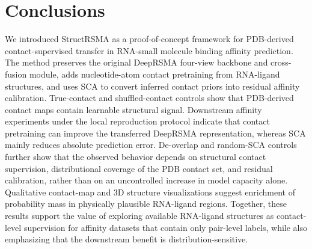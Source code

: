 ﻿\documentclass[journal=jcisd8,manuscript=article]{achemso}
\begin{document}
\section{Conclusions}

We introduced StructRSMA as a proof-of-concept framework for PDB-derived contact-supervised transfer in RNA-small molecule binding affinity prediction. The method preserves the original DeepRSMA four-view backbone and cross-fusion module, adds nucleotide-atom contact pretraining from RNA-ligand structures, and uses SCA to convert inferred contact priors into residual affinity calibration. True-contact and shuffled-contact controls show that PDB-derived contact maps contain learnable structural signal. Downstream affinity experiments under the local reproduction protocol indicate that contact pretraining can improve the transferred DeepRSMA representation, whereas SCA mainly reduces absolute prediction error. De-overlap and random-SCA controls further show that the observed behavior depends on structural contact supervision, distributional coverage of the PDB contact set, and residual calibration, rather than on an uncontrolled increase in model capacity alone. Qualitative contact-map and 3D structure visualizations suggest enrichment of probability mass in physically plausible RNA-ligand regions. Together, these results support the value of exploring available RNA-ligand structures as contact-level supervision for affinity datasets that contain only pair-level labels, while also emphasizing that the downstream benefit is distribution-sensitive.


\end{document}
